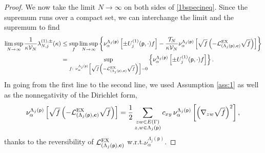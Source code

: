 \documentclass[11pt]{amsart}
\theoremstyle{plain}
\theoremstyle{definition}
\theoremstyle{remark}
\begin{document}
\begin{proof}
We now take the limit $N\to\infty$ on both sides of \eqref{1bspecineq}. Since the supremum runs over a compact set, we can interchange the limit and the supremum to find
\begin{align}
\label{1bsup}
\limsup_{N\to\infty} \frac{1}{\kappa \mathcal{V}_N} \lambda^{(1),\pm}_{N,j}(\kappa) & \leq
\sup_f \limsup_{N\to\infty} \left\{ \nu_\alpha^{\Lambda_j({\mathsf{p}})} \left[ \pm{U^{(1)}_{{{j}}}}({\mathsf{p}},\cdot) f\right] - \frac{\mathcal{T}_N}{\kappa \mathcal{V}_N} \nu_\alpha^{\Lambda_j({\mathsf{p}})} \left[\sqrt{f}\left( -\mathcal{L}^{\rm EX}_{(\Lambda_j({\mathsf{p}}),{\bf c})} \sqrt{f}\right)\right]\right\} \\
\nonumber & = \sup_{f:~ \nu_\alpha^{\Lambda_j({\mathsf{p}})}\left[\sqrt{f}\left(-\mathcal{L}^{\rm EX}_{(\Lambda_j({\mathsf{p}}), {\bf c})}\sqrt{f}\right)\right]=0} \left\{\nu_\alpha^{\Lambda_j({\mathsf{p}})} \left[\pm {U^{(1)}_{{{j}}}}({\mathsf{p}},\cdot) f\right] \right\}.
\end{align}
In going from the first line to the second line, we used Assumption \ref{ass:1} as well as the nonnegativity of the Dirichlet form,
\begin{align*} \nu_\alpha^{\Lambda_j({\mathsf{p}})} \left[\sqrt{f}\left( -\mathcal{L}^{\rm EX}_{(\Lambda_j({\mathsf{p}}),{\bf c})} \sqrt{f}\right)\right] = \frac{1}{2} \sum_{\substack{zw\in E(\Gamma)\\ z,w\in \Lambda_j({\mathsf{p}})}} c_{xy} \,\nu_\alpha^{\Lambda_j({\mathsf{p}})}  \left[\left(\nabla_{zw} \sqrt f\right)^2 \right],
\end{align*}
thanks to the reversibility of $\mathcal{L}^{\rm EX}_{(\Lambda_j({\mathsf{p}}),{\bf c})}$ w.r.t.\@ $\nu_\alpha^{\Lambda_j({\mathsf{p}})}$.


\end{proof}
\end{document}
